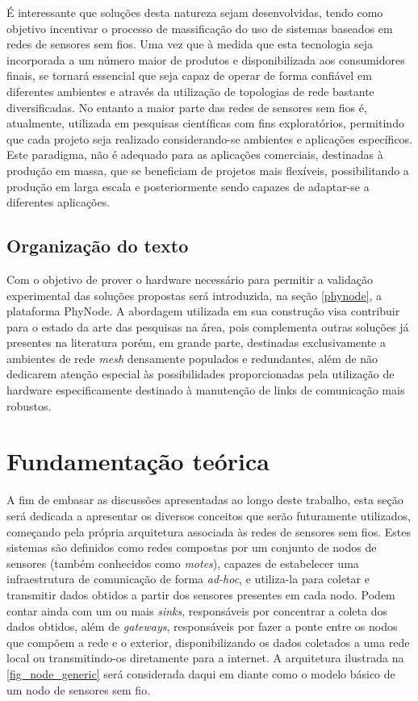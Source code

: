\documentclass[
	12pt,				%
	openright,			%
	oneside,
	a4paper,			%
	english,			%
	french,				%
	spanish,			%
	brazil				%
	]{abntex2}
\begin{document}
É interessante que soluções desta natureza sejam desenvolvidas, tendo como objetivo incentivar o processo de massificação do uso de sistemas baseados em redes de sensores sem fios. Uma vez que à medida que esta tecnologia seja incorporada a um número maior de produtos e disponibilizada aos consumidores finais, se tornará essencial que seja capaz de operar de forma confiável em diferentes ambientes e através da utilização de topologias de rede bastante diversificadas. No entanto a maior parte das redes de sensores sem fios é, atualmente, utilizada em pesquisas científicas com fins exploratórios, permitindo que cada projeto seja realizado considerando-se ambientes e aplicações específicos. Este paradigma, não é adequado para as aplicações comerciais, destinadas à produção em massa, que se beneficiam de projetos mais flexíveis, possibilitando a produção em larga escala e posteriormente sendo capazes de adaptar-se a diferentes aplicações.

\section{Organização do texto}

Com o objetivo de prover o hardware necessário para permitir a validação experimental das soluções propostas será introduzida, na seção \ref{phynode}, a plataforma PhyNode. A abordagem utilizada em sua construção visa contribuir para o estado da arte das pesquisas na área, pois complementa outras soluções já presentes na literatura \cite{Pantazis2013, Tarique2009} porém, em grande parte, destinadas exclusivamente a ambientes de rede \textit{mesh} densamente populados e redundantes, além de não dedicarem atenção especial às possibilidades proporcionadas pela utilização de hardware especificamente destinado à manutenção de links de comunicação mais robustos.

\chapter{Fundamentação teórica}
A fim de embasar as discussões apresentadas ao longo deste trabalho, esta seção será dedicada a apresentar os diversos conceitos que serão futuramente utilizados, começando pela própria arquitetura associada às redes de sensores sem fios. Estes sistemas são definidos como redes compostas por um conjunto de nodos de sensores (também conhecidos como \textit{motes}), capazes de estabelecer uma infraestrutura de comunicação de forma \textit{ad-hoc}, e utiliza-la para coletar e transmitir dados obtidos a partir dos sensores presentes em cada nodo. Podem contar ainda com um ou mais \textit{sinks}, responsáveis por concentrar a coleta dos dados obtidos, além de \textit{gateways}, responsáveis por fazer a ponte entre os nodos que compõem a rede e o exterior, disponibilizando os dados coletados a uma rede local ou transmitindo-os diretamente para a internet. A arquitetura ilustrada na \autoref{fig_node_generic} será considerada daqui em diante como o modelo básico de um nodo de sensores sem fio. 
\end{document}
